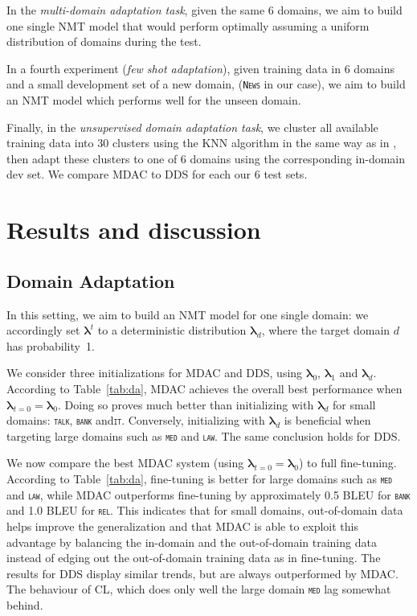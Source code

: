 \documentclass[11pt]{article}
\newcommand{\domain}[1]{\texttt{\textsc{#1}}}
\newcommand{\vlambda}{\ensuremath{\boldsymbol\lambda}\xspace} %
\begin{document}
In the \emph{multi-domain adaptation task}, given the same 6 domains, we aim to build one single NMT model that would perform optimally assuming a uniform distribution of domains during the test.

In a fourth experiment (\emph{few shot adaptation}), given training data in 6 domains and a small development set of a new domain, (\domain{News} in our case), we aim to build an NMT model which performs well for the unseen domain.

Finally, in the \emph{unsupervised domain adaptation task}, we cluster all available training data into 30 clusters using the KNN algorithm in the same way as in \citep{Tars18multidomain}, then adapt these clusters to one of 6 domains using the corresponding in-domain dev set. We compare MDAC to DDS for each our 6 test sets.

\section{Results and discussion \label{sec:results}}

\subsection{Domain Adaptation}\label{ssec:da}
In this setting, we aim to build an NMT model for one single domain: we accordingly set $\vlambda^t$ to a deterministic distribution $\vlambda_d$, where the target domain $d$ has probability~1.

We consider three initializations for MDAC and DDS, using $\vlambda_0$, $\vlambda_1$ and $\vlambda_d$. According to Table~\ref{tab:da}, MDAC achieves the overall best performance when $\vlambda_{t=0} = \vlambda_0$.  Doing so proves much better than initializing with $\vlambda_d$ for small domains: \domain{talk}, \domain{bank} and\domain{it}. Conversely, initializing with $\vlambda_d$ is beneficial when targeting large domains such as \domain{med} and \domain{law}. The same conclusion holds for DDS. 

We now compare the best MDAC system (using $\vlambda_{t=0} = \vlambda_0$) to full fine-tuning. According to Table~\ref{tab:da}, fine-tuning is better for large domains such as \domain{med} and \domain{law}, while MDAC outperforms fine-tuning by approximately 0.5 BLEU for \domain{bank} and 1.0 BLEU for \domain{rel}. This indicates that for small domains, out-of-domain data helps improve the generalization and that MDAC is able to exploit this advantage by balancing the in-domain and the out-of-domain training data instead of edging out the out-of-domain training data as in fine-tuning. The results for DDS display similar trends, but are always outperformed by MDAC. The behaviour of CL, which does only well the large domain \domain{med} lag somewhat behind.
\end{document}
